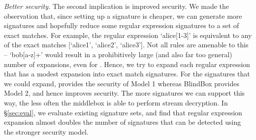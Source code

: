\textit{Better security.}
The second implication is improved security. We made the observation that, since setting up a signature is cheaper, we can generate more signatures and hopefully reduce some regular expression signatures to a set of exact matches.  
For example, the regular expression `alice[1-3]' is equivalent to any of the exact matches [`alice1', `alice2', `alice3']. 
Not all rules are amenable to this -- \eg{} `bob[a-z]+' would result in a prohibitively large (and also far too general) number of expansions, even for \sys. 
Hence, we try to expand each regular expression that has a modest expansion into exact match signatures. 
For the signatures that we could expand, \sys provides the security of Model 1 whereas BlindBox provides Model 2, and hence \sys improves security. 
The more signatures we can support this way, the less often the middlebox is able to perform stream decryption. 
In \S\ref{sec:eval}, we evaluate existing signature sets, and find that regular expression expansion almost doubles the number of signatures that can be detected using the stronger security model.




